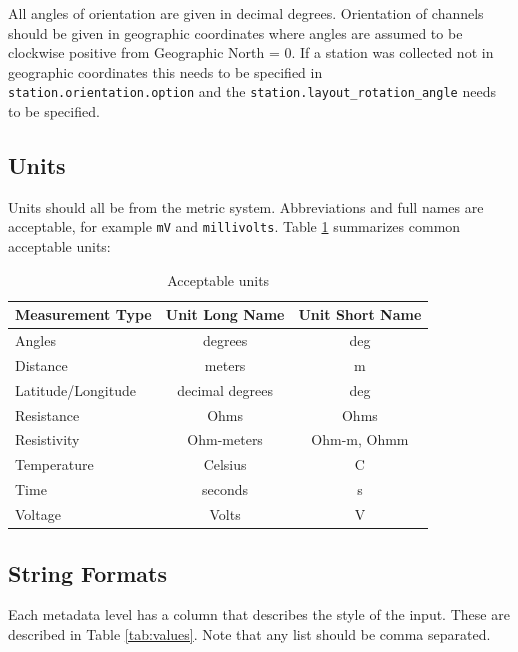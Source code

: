 \documentclass{article}
\begin{document}
All angles of orientation are given in decimal degrees.  Orientation of channels should be given in geographic coordinates where angles are assumed to be clockwise positive from Geographic North = 0.  If a station was collected not in geographic coordinates this needs to be specified in \verb|station.orientation.option| and the \verb|station.layout_rotation_angle| needs to be specified.   

\subsection{Units}
Units should all be from the metric system.  Abbreviations and full names are acceptable, for example \verb|mV| and \verb|millivolts|.  Table \ref{tab:units} summarizes common acceptable units:


\begin{table}[h!]
	\centering
	\caption[Acceptable units]{Acceptable units}
	\begin{tabular}{|l|c|c|}
		\hline
		\textbf{Measurement Type} & \textbf{Unit Long Name}  & \textbf{Unit Short Name} \\ \hline
		Angles & degrees & deg \\ \hline
		
		Distance &  meters & m \\ \hline
		Latitude/Longitude & decimal degrees & deg \\ \hline
		Resistance & Ohms  &  Ohms \\ \hline
		Resistivity & Ohm-meters & Ohm-m, Ohmm \\ \hline
		Temperature & Celsius & C \\ \hline
		Time & seconds & s \\ \hline
		Voltage & Volts & V \\ \hline
		
		
	\end{tabular}
	\label{tab:units}
\end{table}

\subsection{String Formats}

Each metadata level has a column that describes the style of the input.  These are described in Table \ref{tab:values}.  Note that any list should be comma separated.
\end{document}
